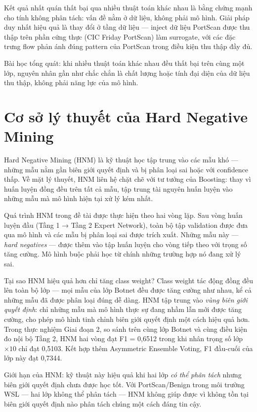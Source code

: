 \documentclass[../DoAn.tex]{subfiles}
\begin{document}
Kết quả nhất quán thất bại qua nhiều thuật toán khác nhau là bằng chứng mạnh cho tính không phân tách: vấn đề nằm ở dữ liệu, không phải mô hình. Giải pháp duy nhất hiệu quả là thay đổi ở tầng dữ liệu --- inject dữ liệu PortScan được thu thập trên phần cứng thực (CIC Friday PortScan) làm surrogate, với các đặc trưng flow phản ánh đúng pattern của PortScan trong điều kiện thu thập đầy đủ.

Bài học tổng quát: khi nhiều thuật toán khác nhau đều thất bại trên cùng một lớp, nguyên nhân gần như chắc chắn là chất lượng hoặc tính đại diện của dữ liệu thu thập, không phải năng lực của mô hình.

\section{Cơ sở lý thuyết của Hard Negative Mining}
\label{sec:pt-hnm}

Hard Negative Mining (HNM) là kỹ thuật học tập trung vào các mẫu khó --- những mẫu nằm gần biên giới quyết định và bị phân loại sai hoặc với confidence thấp. Về mặt lý thuyết, HNM liên hệ chặt chẽ với tư tưởng của Boosting: thay vì huấn luyện đồng đều trên tất cả mẫu, tập trung tài nguyên huấn luyện vào những mẫu mà mô hình hiện tại xử lý kém nhất.

Quá trình HNM trong đề tài được thực hiện theo hai vòng lặp. Sau vòng huấn luyện đầu (Tầng 1 → Tầng 2 Expert Network), toàn bộ tập validation được đưa qua mô hình và các mẫu bị phân loại sai được trích xuất. Những mẫu này --- \textit{hard negatives} --- được thêm vào tập huấn luyện cho vòng tiếp theo với trọng số tăng cường. Mô hình buộc phải học từ chính những trường hợp nó đang xử lý sai.

Tại sao HNM hiệu quả hơn chỉ tăng class weight? Class weight tác động đồng đều lên toàn bộ lớp --- mọi mẫu của lớp Botnet đều được tăng cường như nhau, kể cả những mẫu đã được phân loại đúng dễ dàng. HNM tập trung vào \textit{vùng biên giới quyết định}: chỉ những mẫu mà mô hình thực sự đang nhầm lẫn mới được tăng cường, cho phép mô hình tinh chỉnh biên giới quyết định một cách hiệu quả hơn. Trong thực nghiệm Giai đoạn 2, so sánh trên cùng lớp Botnet và cùng điều kiện đo nội bộ Tầng 2, HNM hai vòng đạt F1 = 0,6512 trong khi nhân trọng số lớp $\times 10$ chỉ đạt 0,5103. Kết hợp thêm Asymmetric Ensemble Voting, F1 đầu-cuối của lớp này đạt 0,7344.

Giới hạn của HNM: kỹ thuật này hiệu quả khi hai lớp \textit{có thể phân tách} nhưng biên giới quyết định chưa được học tốt. Với PortScan/Benign trong môi trường WSL --- hai lớp không thể phân tách --- HNM không giúp được vì không tồn tại biên giới quyết định nào phân tách chúng một cách đáng tin cậy.
\end{document}
